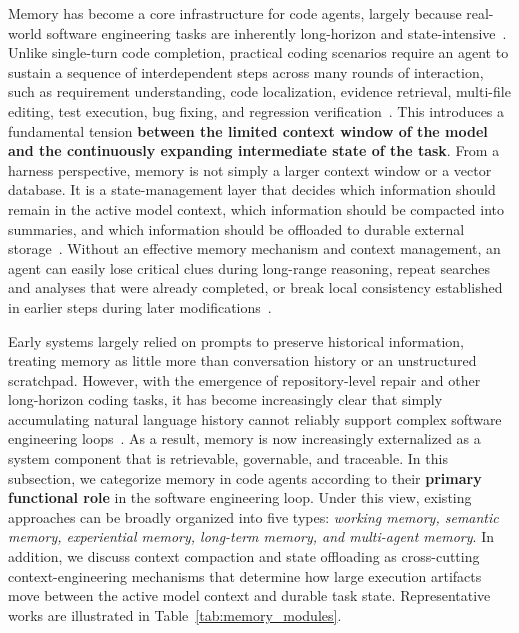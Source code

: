 Memory has become a core infrastructure for code agents, largely because real-world software engineering tasks are inherently long-horizon and state-intensive~\cite{dong2025survey,huang2026rethinking}. Unlike single-turn code completion, practical coding scenarios require an agent to sustain a sequence of interdependent steps across many rounds of interaction, such as requirement understanding, code localization, evidence retrieval, multi-file editing, test execution, bug fixing, and regression verification~\cite{xia2025demystifying,zhang2025survey}. This introduces a fundamental tension \textbf{between the limited context window of the model and the continuously expanding intermediate state of the task}. 
From a harness perspective, memory is not simply a larger context window or a vector database. It is a state-management layer that decides which information should remain in the active model context, which information should be compacted into summaries, and which information should be offloaded to durable external storage~\cite{zhou2026externalization}.
Without an effective memory mechanism and context management, an agent can easily lose critical clues during long-range reasoning, repeat searches and analyses that were already completed, or break local consistency established in earlier steps during later modifications~\cite{zhang2025ragsurvey,huang2026rethinking}.




Early systems largely relied on prompts to preserve historical information, treating memory as little more than conversation history or an unstructured scratchpad. However, with the emergence of repository-level repair and other long-horizon coding tasks, it has become increasingly clear that simply accumulating natural language history cannot reliably support complex software engineering loops~\cite{jiang2026survey}. As a result, memory is now increasingly externalized as a system component that is retrievable, governable, and traceable. In this subsection, we categorize memory in code agents according to their \textbf{primary functional role} in the software engineering loop. Under this view, existing approaches can be broadly organized into five types: \textit{working memory, semantic memory, experiential memory, long-term memory, and multi-agent memory}. In addition, we discuss context compaction and state offloading as cross-cutting context-engineering mechanisms that determine how large execution artifacts move between the active model context and durable task state. Representative works are illustrated in Table~\ref{tab:memory_modules}.



